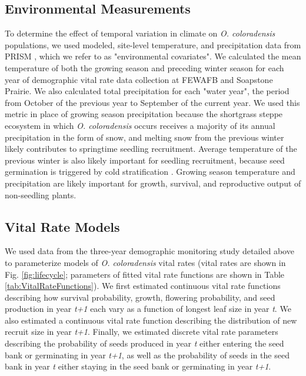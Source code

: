 \documentclass[12pt, letterpaper]{article}
\begin{document}
\subsection{Environmental Measurements}
To determine the effect of temporal variation in climate on \textit{O. coloradensis} populations, we used modeled, site-level temperature, and precipitation data from PRISM \cite{PRISMClimateGroupOregonStateUniversity2021PRISMUniversity}, which we refer to as "environmental covariates". We calculated the mean temperature of both the growing season and preceding winter season for each year of demographic vital rate data collection at FEWAFB and Soapstone Prairie. We also calculated total precipitation for each "water year", the period from October of the previous year to September of the current year. We used this metric in place of growing season precipitation because the shortgrass steppe ecosystem in which \textit{O. coloradensis} occurs receives a majority of its annual precipitation in the form of snow, and melting snow from the previous winter likely contributes to springtime seedling recruitment. Average temperature of the previous winter is also likely important for seedling recruitment, because seed germination is triggered by cold stratification \cite{Burgess2005CapsuleColoradensis}. Growing season temperature and precipitation are likely important for growth, survival, and reproductive output of non-seedling plants. 

\subsection{Vital Rate Models}
We used data from the three-year demographic monitoring study detailed above to parameterize models of \textit{O. coloradensis} vital rates (vital rates are shown in Fig. \ref{fig:lifecycle}; parameters of fitted vital rate functions are shown in Table \ref{tab:VitalRateFunctions}). We first estimated continuous vital rate functions describing how survival probability, growth, flowering probability, and seed production in year \textit{t+1} each vary as a function of longest leaf size in year \textit{t}. We also estimated a continuous vital rate function describing the distribution of new recruit size in year \textit{t+1}. Finally, we estimated discrete vital rate parameters describing the probability of seeds produced in year \textit{t} either entering the seed bank or germinating in year \textit{t+1}, as well as the probability of seeds in the seed bank in year \textit{t} either staying in the seed bank or germinating in year \textit{t+1}.  
\end{document}
